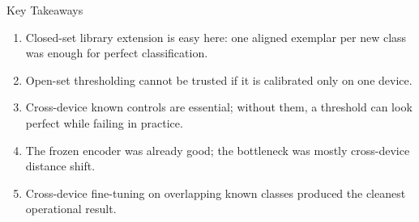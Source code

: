 \documentclass[aspectratio=169]{beamer}
\begin{document}
\begin{frame}{Key Takeaways}
  \begin{enumerate}
    \item Closed-set library extension is easy here: one aligned exemplar per new class was enough for perfect classification.
    \item Open-set thresholding cannot be trusted if it is calibrated only on one device.
    \item Cross-device known controls are essential; without them, a threshold can look perfect while failing in practice.
    \item The frozen encoder was already good; the bottleneck was mostly cross-device distance shift.
    \item Cross-device fine-tuning on overlapping known classes produced the cleanest operational result.
  \end{enumerate}
\end{frame}
\end{document}
